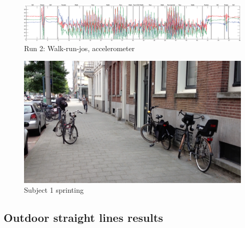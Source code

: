 \begin{figure}
\centering
  \includegraphics[width=1\textwidth]{./Figures/chapter6/data_collection/run-2-walk-run-jos/data_plot_acc_annotated.eps}
  \caption[R2: accelerometer]{Run 2: Walk-run-jos, accelerometer}
  \label{fig:data_gathering_run_2_acc}
\end{figure}


\begin{figure}
\centering
  \includegraphics[width=1\textwidth]{./Figures/chapter6/data_collection/stills/jos_sprint.png}
  \caption[Recording still 4]{Subject 1 sprinting}
  \label{fig:data_gathering_still_1_sprint}
\end{figure}





\subsection{Outdoor straight lines results}

